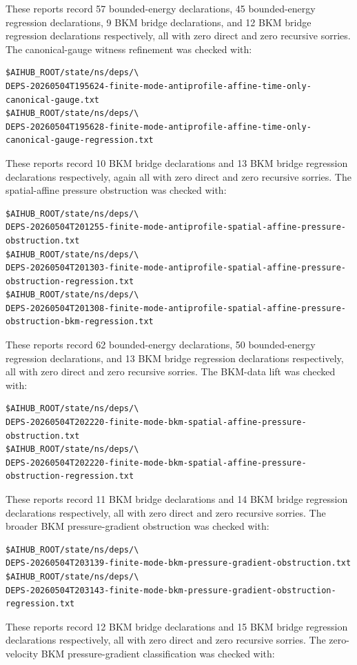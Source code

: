 \documentclass[11pt]{article}
\begin{document}
These reports record 57 bounded-energy declarations, 45 bounded-energy
regression declarations, 9 BKM bridge declarations, and 12 BKM bridge
regression declarations respectively, all with zero direct and zero recursive
sorries.
The canonical-gauge witness refinement was checked with:
\begin{verbatim}
$AIHUB_ROOT/state/ns/deps/\
DEPS-20260504T195624-finite-mode-antiprofile-affine-time-only-canonical-gauge.txt
$AIHUB_ROOT/state/ns/deps/\
DEPS-20260504T195628-finite-mode-antiprofile-affine-time-only-canonical-gauge-regression.txt
\end{verbatim}
These reports record 10 BKM bridge declarations and 13 BKM bridge regression
declarations respectively, again all with zero direct and zero recursive
sorries.
The spatial-affine pressure obstruction was checked with:
\begin{verbatim}
$AIHUB_ROOT/state/ns/deps/\
DEPS-20260504T201255-finite-mode-antiprofile-spatial-affine-pressure-obstruction.txt
$AIHUB_ROOT/state/ns/deps/\
DEPS-20260504T201303-finite-mode-antiprofile-spatial-affine-pressure-obstruction-regression.txt
$AIHUB_ROOT/state/ns/deps/\
DEPS-20260504T201308-finite-mode-antiprofile-spatial-affine-pressure-obstruction-bkm-regression.txt
\end{verbatim}
These reports record 62 bounded-energy declarations, 50 bounded-energy
regression declarations, and 13 BKM bridge regression declarations respectively,
all with zero direct and zero recursive sorries.
The BKM-data lift was checked with:
\begin{verbatim}
$AIHUB_ROOT/state/ns/deps/\
DEPS-20260504T202220-finite-mode-bkm-spatial-affine-pressure-obstruction.txt
$AIHUB_ROOT/state/ns/deps/\
DEPS-20260504T202220-finite-mode-bkm-spatial-affine-pressure-obstruction-regression.txt
\end{verbatim}
These reports record 11 BKM bridge declarations and 14 BKM bridge regression
declarations respectively, all with zero direct and zero recursive sorries.
The broader BKM pressure-gradient obstruction was checked with:
\begin{verbatim}
$AIHUB_ROOT/state/ns/deps/\
DEPS-20260504T203139-finite-mode-bkm-pressure-gradient-obstruction.txt
$AIHUB_ROOT/state/ns/deps/\
DEPS-20260504T203143-finite-mode-bkm-pressure-gradient-obstruction-regression.txt
\end{verbatim}
These reports record 12 BKM bridge declarations and 15 BKM bridge regression
declarations respectively, all with zero direct and zero recursive sorries.
The zero-velocity BKM pressure-gradient classification was checked with:
\end{document}
